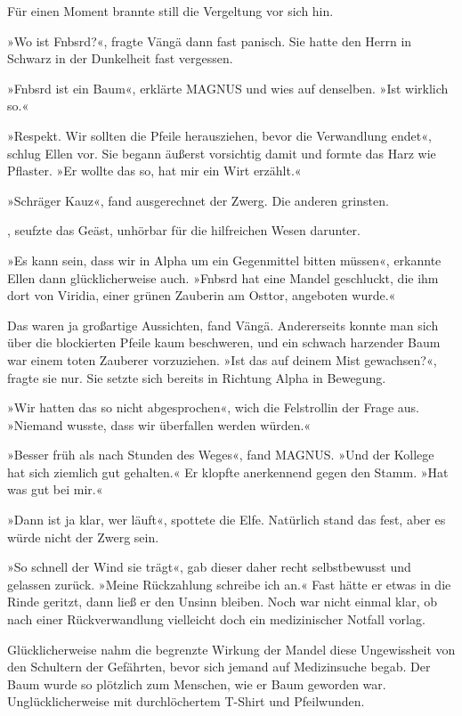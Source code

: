 Für einen Moment brannte still die Vergeltung vor sich hin.

»Wo ist Fnbsrd?«, fragte Vängä dann fast panisch. Sie hatte den Herrn in Schwarz in der Dunkelheit fast vergessen.

»Fnbsrd ist ein Baum«, erklärte MAGNUS und wies auf denselben. »Ist wirklich so.«

»Respekt. Wir sollten die Pfeile herausziehen, bevor die Verwandlung endet«, schlug Ellen vor. Sie begann äußerst vorsichtig damit und formte das Harz wie Pflaster. »Er wollte das so, hat mir ein Wirt erzählt.«

»Schräger Kauz«, fand ausgerechnet der Zwerg. Die anderen grinsten.

, seufzte das Geäst, unhörbar für die hilfreichen Wesen darunter. 

»Es kann sein, dass wir in Alpha um ein Gegenmittel bitten müssen«, erkannte Ellen dann glücklicherweise auch. »Fnbsrd hat eine Mandel geschluckt, die ihm dort von Viridia, einer grünen Zauberin am Osttor, angeboten wurde.«

Das waren ja großartige Aussichten, fand Vängä. Andererseits konnte man sich über die blockierten Pfeile kaum beschweren, und ein schwach harzender Baum war einem toten Zauberer vorzuziehen. »Ist das auf deinem Mist gewachsen?«, fragte sie nur. Sie setzte sich bereits in Richtung Alpha in Bewegung.

»Wir hatten das so nicht abgesprochen«, wich die Felstrollin der Frage aus. »Niemand wusste, dass wir überfallen werden würden.«

»Besser früh als nach Stunden des Weges«, fand MAGNUS. »Und der Kollege hat sich ziemlich gut gehalten.« Er klopfte anerkennend gegen den Stamm. »Hat was gut bei mir.«

»Dann ist ja klar, wer läuft«, spottete die Elfe. Natürlich stand das fest, aber es würde nicht der Zwerg sein.

»So schnell der Wind sie trägt«, gab dieser daher recht selbstbewusst und gelassen zurück. »Meine Rückzahlung schreibe ich an.« Fast hätte er etwas in die Rinde geritzt, dann ließ er den Unsinn bleiben. Noch war nicht einmal klar, ob nach einer Rückverwandlung vielleicht doch ein medizinischer Notfall vorlag.

Glücklicherweise nahm die begrenzte Wirkung der Mandel diese Ungewissheit von den Schultern der Gefährten, bevor sich jemand auf Medizinsuche begab. Der Baum wurde so plötzlich zum Menschen, wie er Baum geworden war. Unglücklicherweise mit durchlöchertem T-Shirt und Pfeilwunden.

